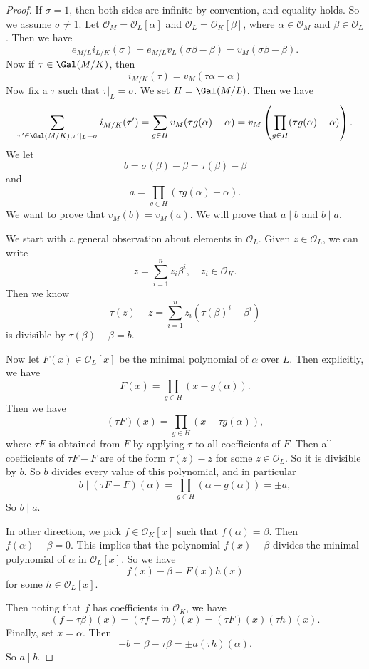 \documentclass[a4paper]{article}
\begin{document}
\begin{proof}
  If $\sigma = 1$, then both sides are infinite by convention, and equality holds. So we assume $\sigma \not= 1$. Let $\mathcal{O}_M = \mathcal{O}_L[\alpha]$ and $\mathcal{O}_L = \mathcal{O}_K[\beta]$, where $\alpha \in \mathcal{O}_M$ and $\beta \in \mathcal{O}_L$. Then we have
  \[
    e_{M/L} i_{L/K}(\sigma) = e_{M/L} v_L(\sigma \beta - \beta) = v_M(\sigma \beta - \beta).
  \]
  Now if $\tau \in \Gal(M/K)$, then
  \[
    i_{M/K}(\tau) = v_M(\tau \alpha - \alpha)
  \]
  Now fix a $\tau$ such that $\tau|_L = \sigma$. We set $H = \Gal(M/L)$. Then we have
  \[
    \sum_{\tau' \in \Gal(M/K), \tau'|_L = \sigma} i_{M/K}(\tau') = \sum_{g\in H}v_M(\tau g(\alpha) - \alpha) = v_M\left(\prod_{g \in H} (\tau g(\alpha) - \alpha)\right).
  \]
  We let
  \[
    b = \sigma(\beta) - \beta = \tau(\beta) - \beta
  \]
  and
  \[
    a = \prod_{g \in H} (\tau g(\alpha) - \alpha).
  \]
  We want to prove that $v_M(b) = v_M(a)$. We will prove that $a \mid b$ and $b \mid a$.

  We start with a general observation about elements in $\mathcal{O}_L$. Given $z \in \mathcal{O}_L$, we can write
  \[
    z = \sum_{i = 1}^n z_i \beta^i,\quad z_i \in \mathcal{O}_K.
  \]
  Then we know
  \[
    \tau(z) - z = \sum_{i = 1}^n z_i(\tau(\beta)^i - \beta^i)
  \]
  is divisible by $\tau(\beta) - \beta = b$.

  Now let $F(x) \in \mathcal{O}_L[x]$ be the minimal polynomial of $\alpha$ over $L$. Then explicitly, we have
  \[
    F(x) = \prod_{g \in H}(x - g(\alpha)).
  \]
  Then we have
  \[
    (\tau F)(x) = \prod_{g \in H} (x - \tau g(\alpha)),
  \]
  where $\tau F$ is obtained from $F$ by applying $\tau$ to all coefficients of $F$. Then all coefficients of $\tau F - F$ are of the form $\tau(z) - z$ for some $z \in \mathcal{O}_L$. So it is divisible by $b$. So $b$ divides every value of this polynomial, and in particular
  \[
    b \mid (\tau F - F)(\alpha) = \prod_{g \in H}(\alpha - g(\alpha)) = \pm a,
  \]
  So $b \mid a$.

  In other direction, we pick $f \in \mathcal{O}_K[x]$ such that $f(\alpha) = \beta$. Then $f(\alpha) - \beta = 0$. This implies that the polynomial $f(x) - \beta$ divides the minimal polynomial of $\alpha$ in $\mathcal{O}_L[x]$. So we have
  \[
    f(x) - \beta = F(x) h(x)
  \]
  for some $h \in \mathcal{O}_L[x]$.

  Then noting that $f$ has coefficients in $\mathcal{O}_K$, we have
  \[
    (f - \tau \beta)(x) = (\tau f - \tau b) (x) = (\tau F)(x) (\tau h)(x).
  \]
  Finally, set $x = \alpha$. Then
  \[
    -b = \beta - \tau \beta = \pm a (\tau h)(\alpha).
  \]
  So $a \mid b$.
\end{proof}
\end{document}
